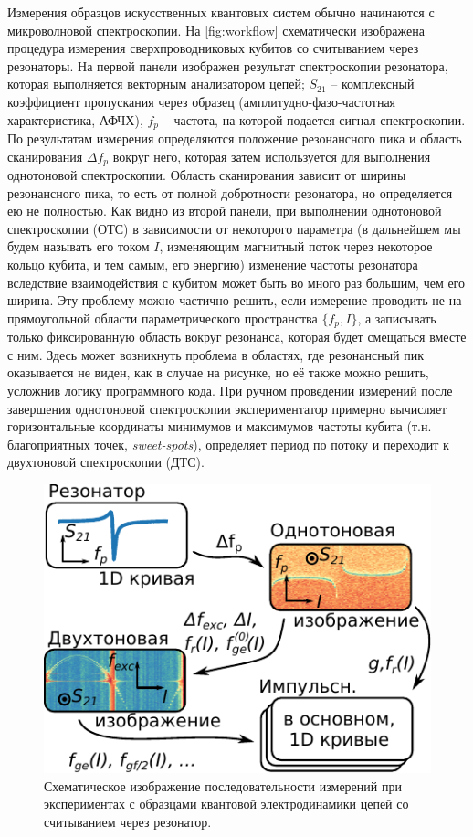 \documentclass[14pt, a4paper]{extreport}
\numberwithin{equation}{section}
\begin{document}
Измерения образцов искусственных квантовых систем обычно начинаются с микроволновой спектроскопии. На \autoref{fig:workflow} схематически изображена процедура измерения сверхпроводниковых кубитов со считыванием через резонаторы. На первой панели изображен результат спектроскопии резонатора, которая выполняется векторным анализатором цепей; $S_{21}$ -- комплексный коэффициент пропускания через образец (амплитудно-фазо-частотная характеристика, АФЧХ), $f_p$ -- частота, на которой подается сигнал спектроскопии. По результатам измерения определяются положение резонансного пика и область сканирования $\Delta f_p$ вокруг него, которая затем используется для выполнения однотоновой спектроскопии. Область сканирования зависит от ширины резонансного пика, то есть от полной добротности \cite{fedorov2017} резонатора, но определяется ею не полностью. Как видно из второй панели, при выполнении однотоновой спектроскопии (ОТС) в зависимости от некоторого параметра (в дальнейшем мы будем называть его током $I$, изменяющим магнитный поток через некоторое кольцо кубита, и тем самым, его энергию) изменение частоты резонатора вследствие взаимодействия с кубитом может быть во много раз большим, чем его ширина. Эту проблему можно частично решить, если измерение проводить не на прямоугольной области параметрического пространства $\{f_p, I\}$, а записывать только фиксированную область вокруг резонанса, которая будет смещаться вместе с ним. Здесь может возникнуть проблема в областях, где резонансный пик оказывается не виден, как в случае на рисунке, но её также можно решить, усложнив логику программного кода. При ручном проведении измерений после завершения однотоновой спектроскопии экспериментатор примерно вычисляет горизонтальные координаты минимумов и максимумов частоты кубита (т.н. благоприятных точек, \textit{sweet-spots}), определяет период по потоку и переходит к двухтоновой спектроскопии (ДТС). 


\begin{figure}
	\centering
	\includegraphics[width=0.5\linewidth]{Pictures/workflow}
	\caption{Схематическое изображение последовательности измерений при экспериментах с образцами квантовой электродинамики цепей со считыванием через резонатор.}
	\label{fig:workflow}
\end{figure}
\end{document}
